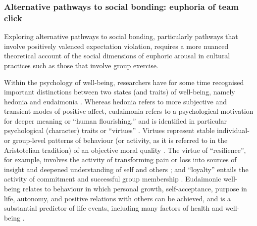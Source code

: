 \begin{CJK}{UTF8}{gbsn}
{%



\subsubsection{Alternative pathways to social bonding: euphoria of team click}
Exploring alternative pathways to social bonding, particularly pathways that involve positively valenced expectation violation, requires a more nuanced theoretical account of the social dimensions of euphoric arousal in cultural practices such as those that involve group exercise.

Within the psychology of well-being, researchers have for some time recognised important distinctions between two states (and traits) of well-being, namely hedonia and eudaimonia \citep{Ryff1989}.  Whereas hedonia refers to more subjective and transient modes of positive affect, eudaimonia refers to a psychological motivation for deeper meaning or ``human flourishing,'' and is identified in particular psychological (character) traits or ``virtues'' \citep{Baumeister2013}.  Virtues represent stable individual- or group-level patterns of behaviour (or activity, as it is referred to in the Aristotelian tradition) of an objective moral quality \citep{Fowers2015}.
The virtue of ``resilience'', for example, involves the activity of transforming pain or loss into sources of insight and deepened understanding of self and others \citep{Ryff2015}; and ``loyalty'' entails the activity of commitment and successful group membership \citep{Fowers2015}.
Eudaimonic well-being relates to behaviour in which personal growth, self-acceptance, purpose in life, autonomy, and positive relations with others can be achieved, and is a substantial predictor of life events, including many factors of health and well-being \citep{Ryff2004,Urry2004}.

}
\end{CJK}

